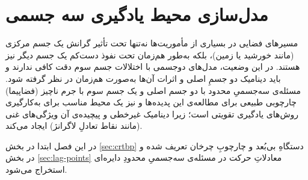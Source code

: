\chapter{مدل‌سازی محیط یادگیری سه‌ جسمی}

مسیرهای فضایی در بسیاری از مأموریت‌ها نه‌تنها تحت تأثیر گرانش یک جسم مرکزی (مانند خورشید یا زمین)، بلکه به‌طور هم‌زمان تحت نفوذ دست‌کم یک جسم دیگر نیز هستند. در این وضعیت، مدل‌های دو‌جسمی با اختلالات جسم سوم دقت کافی ندارند و باید دینامیک دو جسمِ اصلی و اثرات آن‌ها به‌صورت هم‌زمان در نظر گرفته شود. مسئله‌ی سه‌جسمیِ محدود با دو جسم اصلی و یک جسم سوم با جرم ناچیز (فضاپیما) چارچوبی طبیعی برای مطالعه‌ی این پدیده‌ها و نیز یک محیط مناسب برای به‌کارگیری روش‌های یادگیری تقویتی است؛ زیرا دینامیک غیرخطی و پیچیده‌ی آن ویژگی‌های غنی (مانند نقاط تعادلِ لاگرانژ) ایجاد می‌کند.

در این فصل ابتدا در بخش  \ref{sec:crtbp} دستگاهِ بی‌بُعد و چارچوبِ چرخان تعریف شده و در بخش  \ref{sec:lag-points} معادلاتِ حرکت در مسئله‌ی سه‌جسمیِ محدودِ دایره‌ای استخراج می‌شود.





